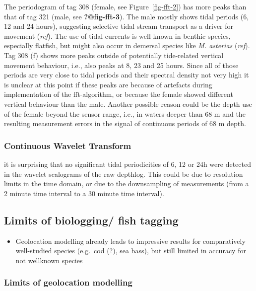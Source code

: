 \documentclass[
  authoryear,
  review,
  3p]{elsarticle}
\providecommand{\tightlist}{%
  \setlength{\itemsep}{0pt}\setlength{\parskip}{0pt}}\usepackage{longtable,booktabs,array}
\begin{document}
The periodogram of tag 308 (female, see Figure~\ref{fig-fft-2}) has more
peaks than that of tag 321 (male, see \textbf{?@fig-fft-3}). The male
mostly shows tidal periods (6, 12 and 24 hours), suggesting selective
tidal stream transport as a driver for movement (\emph{ref}). The use of
tidal currents is well-known in benthic species, especially flatfish,
but might also occur in demersal species like \emph{M. asterias}
(\emph{ref}). Tag 308 (f) shows more peaks outside of potentially
tide-related vertical movement behaviour, i.e., also peaks at 8, 23 and
25 hours. Since all of those periods are very close to tidal periods and
their spectral density not very high it is unclear at this point if
these peaks are because of artefacts during implementation of the
fft-algorithm, or because the female showed different vertical behaviour
than the male. Another possible reason could be the depth use of the
female beyond the sensor range, i.e., in waters deeper than 68 m and the
resulting measurement errors in the signal of continuous periods of 68 m
depth.

\hypertarget{continuous-wavelet-transform}{%
\subsubsection{Continuous Wavelet
Transform}\label{continuous-wavelet-transform}}

it is surprising that no significant tidal periodicities of 6, 12 or 24h
were detected in the wavelet scalograms of the raw depthlog. This could
be due to resolution limits in the time domain, or due to the
downsampling of measurements (from a 2 minute time interval to a 30
minute time interval).

\hypertarget{limits-of-biologging-fish-tagging}{%
\subsection{Limits of biologging/ fish
tagging}\label{limits-of-biologging-fish-tagging}}

\begin{itemize}
\tightlist
\item
  Geolocation modelling already leads to impressive results for
  comparatively well-studied species (e.g.~cod (?), sea bass), but still
  limited in accuracy for not wellknown species
\end{itemize}

\hypertarget{limits-of-geolocation-modelling}{%
\subsubsection{Limits of geolocation
modelling}\label{limits-of-geolocation-modelling}}
\end{document}
